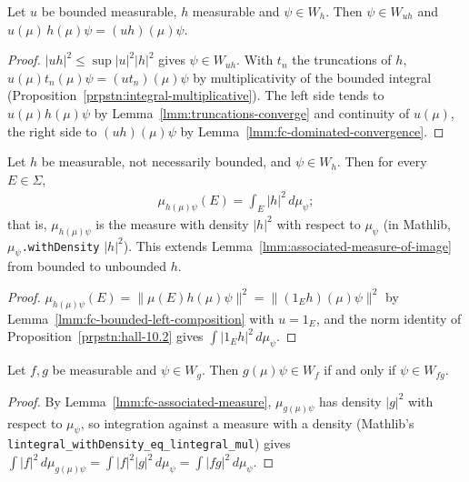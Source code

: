 \begin{lemma}
    \label{lmm:fc-bounded-left-composition}
    \leanok
    Let $u$ be bounded measurable, $h$ measurable and $\psi \in W_h$. Then $\psi \in W_{uh}$ and $u(\mu)\,h(\mu)\psi = (uh)(\mu)\psi$.
\end{lemma}
\begin{proof}
    \leanok
    $|uh|^2 \le \sup|u|^2 |h|^2$ gives $\psi \in W_{uh}$. With $t_n$ the truncations of $h$, $u(\mu) t_n(\mu)\psi = (u t_n)(\mu)\psi$ by multiplicativity of the bounded integral (Proposition~\ref{prpstn:integral-multiplicative}). The left side tends to $u(\mu)h(\mu)\psi$ by Lemma~\ref{lmm:truncations-converge} and continuity of $u(\mu)$, the right side to $(uh)(\mu)\psi$ by Lemma~\ref{lmm:fc-dominated-convergence}.
\end{proof}

\begin{lemma}
    \label{lmm:fc-associated-measure}
    \leanok
    Let $h$ be measurable, not necessarily bounded, and $\psi \in W_h$. Then for every $E \in \Sigma$,
    \begin{align}
        \mu_{h(\mu)\psi}(E) = \int_E |h|^2 \, d\mu_\psi;
    \end{align}
    that is, $\mu_{h(\mu)\psi}$ is the measure with density $|h|^2$ with respect to $\mu_\psi$ (in Mathlib, $\mu_\psi$\texttt{.withDensity} $|h|^2$). This extends Lemma~\ref{lmm:associated-measure-of-image} from bounded to unbounded $h$.
\end{lemma}
\begin{proof}
    \leanok
    $\mu_{h(\mu)\psi}(E) = \|\mu(E)h(\mu)\psi\|^2 = \|(1_E h)(\mu)\psi\|^2$ by Lemma~\ref{lmm:fc-bounded-left-composition} with $u = 1_E$, and the norm identity of Proposition~\ref{prpstn:hall-10.2} gives $\int |1_E h|^2 \, d\mu_\psi$.
\end{proof}

\begin{lemma}
    \label{lmm:fc-composition-domain}
    \leanok
    Let $f, g$ be measurable and $\psi \in W_g$. Then $g(\mu)\psi \in W_f$ if and only if $\psi \in W_{fg}$.
\end{lemma}
\begin{proof}
    \leanok
    By Lemma~\ref{lmm:fc-associated-measure}, $\mu_{g(\mu)\psi}$ has density $|g|^2$ with respect to $\mu_\psi$, so integration against a measure with a density (Mathlib's \texttt{lintegral\_withDensity\_eq\_lintegral\_mul}) gives $\int |f|^2 \, d\mu_{g(\mu)\psi} = \int |f|^2 |g|^2 \, d\mu_\psi = \int |fg|^2 \, d\mu_\psi$.
\end{proof}

